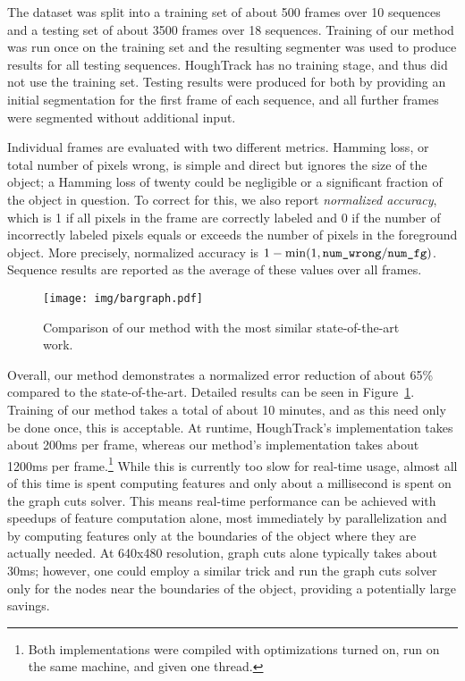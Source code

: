 \documentclass[graybox]{svmult}
\begin{document}
The dataset was split into a training set of about 500 frames over 10 sequences and a testing set of about 3500 frames over 18 sequences.  Training of our method was run once on the training set and the resulting segmenter was used to produce results for all testing sequences. HoughTrack has no training stage, and thus did not use the training set.  Testing results were produced for both by providing an initial segmentation for the first frame of each sequence, and all further frames were segmented without additional input.

Individual frames are evaluated with two different metrics.  Hamming loss, or total number of pixels wrong, is simple and direct but ignores the size of the object; a Hamming loss of twenty could be negligible or a significant fraction of the object in question.  To correct for this, we also report \emph{normalized accuracy}, which is 1 if all pixels in the frame are correctly labeled and 0 if the number of incorrectly labeled pixels equals or exceeds the number of pixels in the foreground object.  More precisely, normalized accuracy is $1 - \min(1, \mbox{\texttt{num\_wrong}} / \mbox{\texttt{num\_fg}})$.  Sequence results are reported as the average of these values over all frames.


\begin{figure}
  \centering
  \texttt{[image: img/bargraph.pdf]}
  \caption{Comparison of our method with the most similar state-of-the-art work.}
  \label{fig:bargraph}
  \vspace{50pt}
\end{figure}


Overall, our method demonstrates a normalized error reduction of about 65\% compared to the state-of-the-art.  Detailed results can be seen in Figure~\ref{fig:bargraph}.  Training of our method takes a total of about 10 minutes, and as this need only be done once, this is acceptable. At runtime, HoughTrack's implementation takes about 200ms per frame, whereas our method's implementation takes about 1200ms per frame.\footnote{Both implementations were compiled with optimizations turned on, run on the same machine, and given one thread.} While this is currently too slow for real-time usage, almost all of this time is spent computing features and only about a millisecond is spent on the graph cuts solver.  This means real-time performance can be achieved with speedups of feature computation alone, most immediately by parallelization and by computing features only at the boundaries of the object where they are actually needed.  At 640x480 resolution, graph cuts alone typically takes about 30ms; however, one could employ a similar trick and run the graph cuts solver only for the nodes near the boundaries of the object, providing a potentially large savings.
\end{document}
